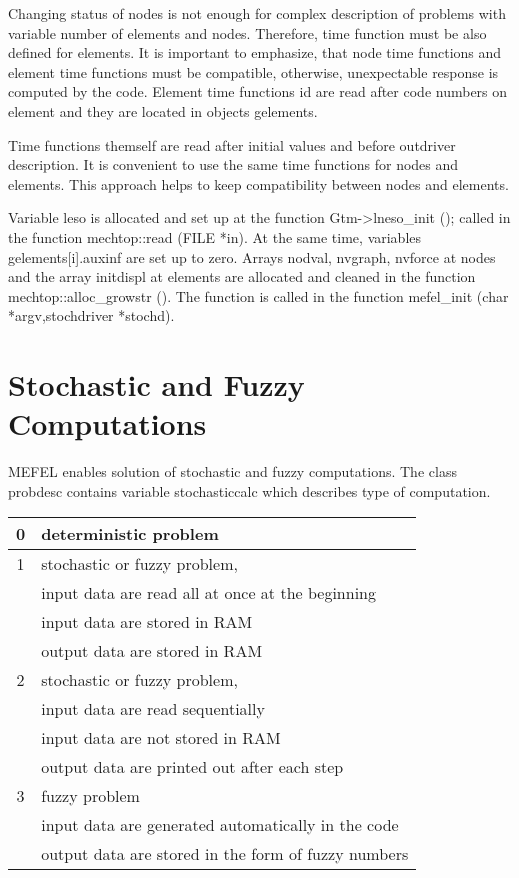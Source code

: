 Changing status of nodes is not enough for complex description of problems with variable
number of elements and nodes. Therefore, time function must be also defined for elements.
It is important to emphasize, that node time functions and element time functions must be
compatible, otherwise, unexpectable response is computed by the code. Element time functions
id are read after code numbers on element and they are located in objects gelements.

Time functions themself are read after initial values and before outdriver description.
It is convenient to use the same time functions for nodes and elements. This approach
helps to keep compatibility between nodes and elements.


Variable leso is allocated and set up at the function Gtm->lneso\_init (); called in the function 
mechtop::read (FILE *in). At the same time, variables gelements[i].auxinf are set up to zero.
Arrays nodval, nvgraph, nvforce at nodes and the array initdispl at elements are allocated
and cleaned in the function mechtop::alloc\_growstr (). The function is called in the function
mefel\_init (char *argv,stochdriver *stochd).


\section{Stochastic and Fuzzy Computations}

MEFEL enables solution of stochastic and fuzzy computations. The class probdesc contains variable
stochasticcalc which describes type of computation.

\begin{center}
\begin{tabular}{|c|l|}
\hline
0 & deterministic problem
\\[2mm] \hline
1 & stochastic or fuzzy problem,
\\
  & input data are read all at once at the beginning
\\
  & input data are stored in RAM
\\
  & output data are stored in RAM
\\[2mm] \hline
2 & stochastic or fuzzy problem,
\\
  & input data are read sequentially
\\
  & input data are not stored in RAM
\\
  & output data are printed out after each step
\\[2mm] \hline
3 & fuzzy problem
\\
  & input data are generated automatically in the code
\\
  & output data are stored in the form of fuzzy numbers
\\ \hline
\end{tabular}
\end{center}

